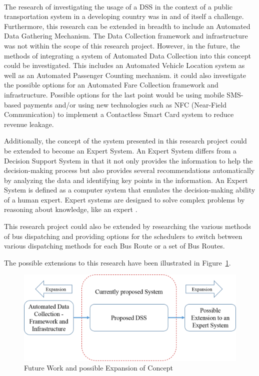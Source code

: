 \documentclass[12pt, oneside]{report}
\begin{document}
\paragraph{} The research of investigating the usage of a DSS in the context of a public transportation system in a developing country was in and of itself a challenge. Furthermore, this research can be extended in breadth to include an Automated Data Gathering Mechanism. The Data Collection framework and infrastructure was not within the scope of this research project. However, in the future, the methods of integrating a system of Automated Data Collection into this concept could be investigated. This includes an Automated Vehicle Location system as well as an Automated Passenger Counting mechanism. it could also investigate the possible options for an Automated Fare Collection framework and infrastructure. Possible options for the last point would be using mobile SMS-based payments and/or using new technologies such as NFC (Near-Field Communication) to implement a Contactless Smart Card system to reduce revenue leakage.

Additionally, the concept of the system presented in this research project could be extended to become an Expert System. An Expert System differs from a Decision Support System in that it not only provides the information to help the decision-making process but also provides several recommendations automatically by analyzing the data and identifying key points in the information. An Expert System is defined as a computer system that emulates the decision-making ability of a human expert. Expert systems are designed to solve complex problems by reasoning about knowledge, like an expert \citep{Jackson1998}.

This research project could also be extended by researching the various methods of bus dispatching and providing options for the schedulers to switch between various dispatching methods for each Bus Route or a set of Bus Routes.

The possible extensions to this research have been illustrated in Figure~\ref{image-futureWork}.

\begin {figure} [h]
\centering
\includegraphics [scale=0.5] {futureWork}
\caption [Future Work and possible Expansion of Concept] {Future Work and possible Expansion of Concept}
\label {image-futureWork}
\end {figure}
\end{document}

